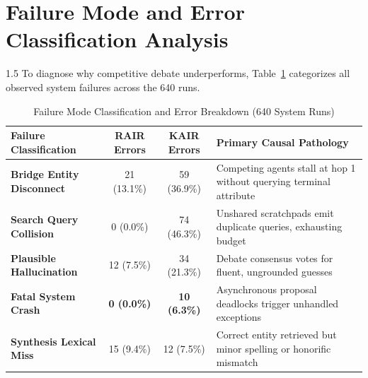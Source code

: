 \documentclass[12pt,a4paper]{report}
\begin{document}
\section{Failure Mode and Error Classification Analysis}
\begin{spacing}{1.5}
To diagnose why competitive debate underperforms, Table~\ref{tab:error_breakdown} categorizes all observed system failures across the 640 runs.

\begin{table}[!htbp]
\centering
\small
\begin{tabular}{|p{4.2cm}|c|c|p{6.0cm}|}
\hline
\textbf{Failure Classification} & \textbf{RAIR Errors} & \textbf{KAIR Errors} & \textbf{Primary Causal Pathology} \\
\hline
\textbf{Bridge Entity Disconnect} & 21 (13.1\%) & 59 (36.9\%) & Competing agents stall at hop 1 without querying terminal attribute \\
\hline
\textbf{Search Query Collision} & 0 (0.0\%) & 74 (46.3\%) & Unshared scratchpads emit duplicate queries, exhausting budget \\
\hline
\textbf{Plausible Hallucination} & 12 (7.5\%) & 34 (21.3\%) & Debate consensus votes for fluent, ungrounded guesses \\
\hline
\textbf{Fatal System Crash} & \textbf{0 (0.0\%)} & \textbf{10 (6.3\%)} & Asynchronous proposal deadlocks trigger unhandled exceptions \\
\hline
\textbf{Synthesis Lexical Miss} & 15 (9.4\%) & 12 (7.5\%) & Correct entity retrieved but minor spelling or honorific mismatch \\
\hline
\end{tabular}
\caption{Failure Mode Classification and Error Breakdown (640 System Runs)}
\label{tab:error_breakdown}
\end{table}
\end{spacing}
\end{document}
